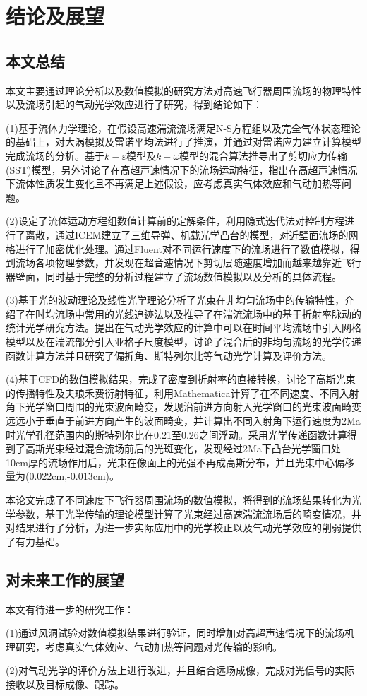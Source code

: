 \chapter{结论及展望}
\section{本文总结}
本文主要通过理论分析以及数值模拟的研究方法对高速飞行器周围流场的物理特性以及流场引起的气动光学效应进行了研究，得到结论如下：

(1)基于流体力学理论，在假设高速湍流流场满足N-S方程组以及完全气体状态理论的基础上，对大涡模拟及雷诺平均法进行了推演，并通过对雷诺应力建立计算模型完成流场的分析。基于$k-\varepsilon$模型及$k-\omega$模型的混合算法推导出了剪切应力传输(SST)模型，另外讨论了在高超声速情况下的流场运动特征，指出在高超声速情况下流体性质发生变化且不再满足上述假设，应考虑真实气体效应和气动加热等问题。

(2)设定了流体运动方程组数值计算前的定解条件，利用隐式迭代法对控制方程进行了离散，通过ICEM建立了三维导弹、机载光学凸台的模型，对近壁面流场的网格进行了加密优化处理。通过Fluent对不同运行速度下的流场进行了数值模拟，得到流场各项物理参数，并发现在超音速情况下剪切层随速度增加而越来越靠近飞行器壁面，同时基于完整的分析过程建立了流场数值模拟以及分析的具体流程。

(3)基于光的波动理论及线性光学理论分析了光束在非均匀流场中的传输特性，介绍了在时均流场中常用的光线追迹法以及推导了在湍流流场中的基于折射率脉动的统计光学研究方法。提出在气动光学效应的计算中可以在时间平均流场中引入网格模型以及在湍流部分引入亚格子尺度模型，讨论了混合后的非均匀流场的光学传递函数计算方法并且研究了偏折角、斯特列尔比等气动光学计算及评价方法。

(4)基于CFD的数值模拟结果，完成了密度到折射率的直接转换，讨论了高斯光束的传播特性及夫琅禾费衍射特征，利用Mathematica计算了在不同速度、不同入射角下光学窗口周围的光束波面畸变，发现沿前进方向射入光学窗口的光束波面畸变远远小于垂直于前进方向产生的波面畸变，并计算出不同入射角下运行速度为2Ma时光学孔径范围内的斯特列尔比在0.21至0.26之间浮动。采用光学传递函数计算得到了高斯光束经过混合流场前后的光斑变化，发现经过2Ma下凸台光学窗口处10cm厚的流场作用后，光束在像面上的光强不再成高斯分布，并且光束中心偏移量为(0.022cm,-0.013cm)。

本论文完成了不同速度下飞行器周围流场的数值模拟，将得到的流场结果转化为光学参数，基于光学传输的理论模型计算了光束经过高速湍流流场后的畸变情况，并对结果进行了分析，为进一步实际应用中的光学校正以及气动光学效应的削弱提供了有力基础。
\section{对未来工作的展望}

本文有待进一步的研究工作：

(1)通过风洞试验对数值模拟结果进行验证，同时增加对高超声速情况下的流场机理研究，考虑真实气体效应、气动加热等问题对光传输的影响。

(2)对气动光学的评价方法上进行改进，并且结合远场成像，完成对光信号的实际接收以及目标成像、跟踪。